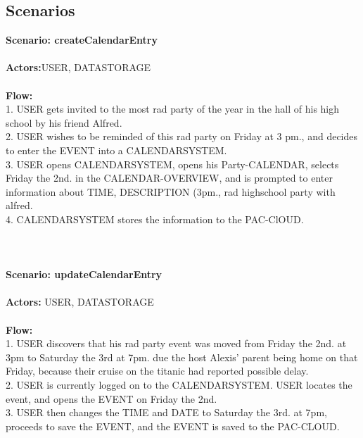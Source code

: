 \subsection{Scenarios}

\textbf{Scenario: createCalendarEntry}\\
\HRule \\[0.4cm]
\textbf{Actors:}USER, DATASTORAGE\\
\HRule \\[0.4cm]
\textbf{Flow:} \\
1. USER gets invited to the most rad party of the year in the hall of his high school by his friend Alfred.\\
2. USER wishes to be reminded of this rad party on Friday at 3 pm., and decides to enter the EVENT into a CALENDARSYSTEM.\\
3. USER opens CALENDARSYSTEM, opens his Party-CALENDAR, selects Friday the 2nd. in the CALENDAR-OVERVIEW, and is prompted to enter information about TIME, DESCRIPTION (3pm., rad highschool party with alfred.\\
4. CALENDARSYSTEM stores the information to the PAC-ClOUD.\\\HRule \\[0.4cm]\\\\
\textbf{Scenario: updateCalendarEntry}\\
\HRule \\[0.4cm]
\textbf{Actors:} USER, DATASTORAGE\\
\HRule \\[0.4cm]
\textbf{Flow:}\\
1. USER discovers that his rad party event was moved from Friday the 2nd. at 3pm to Saturday the 3rd at 7pm. due the host Alexis' parent being home on that Friday, because their cruise on the titanic had reported possible delay.\\
2. USER is currently logged on to the CALENDARSYSTEM. USER locates the event, and opens the EVENT on Friday the 2nd.\\
3. USER then changes the TIME and DATE to Saturday the 3rd. at 7pm, proceeds to save the EVENT, and the EVENT is saved to the PAC-CLOUD.\\
\HRule \\[0.4cm]
\newpage